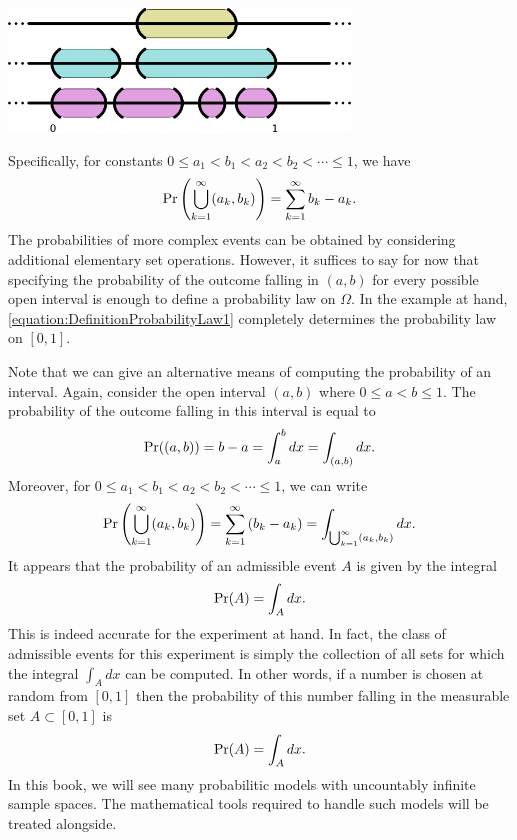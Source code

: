 \begin{center}
\includegraphics[height=3.285cm]{Figures/2Chapter/lineintervals}
\end{center}

Specifically, for constants $0 \leq a_1 < b_1 < a_2 < b_2 < \cdots \leq 1$, we have
\begin{equation*}
\Pr \left( \bigcup_{k=1}^{\infty} (a_k,b_k) \right)
= \sum_{k=1}^{\infty} b_k - a_k .
\end{equation*}
The probabilities of more complex events can be obtained by considering additional elementary set operations.
However, it suffices to say for now that specifying the probability of the outcome falling in $(a,b)$ for every possible open interval is enough to define a probability law on $\Omega$.
In the example at hand, \eqref{equation:DefinitionProbabilityLaw1} completely determines the probability law on $[0,1]$.

Note that we can give an alternative means of computing the probability of an interval.
Again, consider the open interval $(a, b)$ where $0 \leq a < b \leq 1$.
The probability of the outcome falling in this  interval is equal to
\begin{equation*}
\Pr ( (a, b) ) = b - a = \int_a^b dx = \int_{(a,b)} dx .
\end{equation*}
Moreover, for $0 \leq a_1 < b_1 < a_2 < b_2 < \cdots \leq 1$, we can write
\begin{equation*}
\Pr \left( \bigcup_{k=1}^{\infty} (a_k,b_k) \right)
= \sum_{k=1}^{\infty} \left( b_k - a_k \right)
= \int_{\bigcup_{k=1}^{\infty} (a_k,b_k)} dx .
\end{equation*}
It appears that the probability of an admissible event $A$ is given by the integral
\begin{equation*}
\Pr (A) = \int_{A} dx .
\end{equation*}
This is indeed accurate for the experiment at hand.
In fact, the class of admissible events for this experiment is simply the collection of all sets for which the integral $\int_A dx$ can be computed.
In other words, if a number is chosen at random from $[0,1]$ then the probability of this number falling in the measurable set $A \subset [0,1]$ is
\begin{equation*}
\Pr (A) = \int_{A} dx .
\end{equation*}
In this book, we will see many probabilitic models with uncountably infinite sample spaces.
The mathematical tools required to handle such models will be treated alongside.

